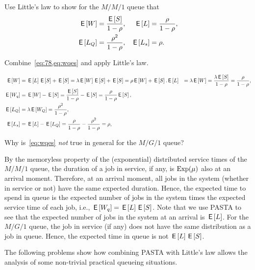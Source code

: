 \begin{exercise}
Use Little's law to show for the $M/M/1$ queue that 
  \begin{align*}
    \,\mathsf{E}\left[W\right] &= \frac{\,\mathsf{E}\left[S\right]}{1-\rho}, & \,\mathsf{E}\left[L\right] &= \frac\rho{1-\rho}, \\
    \,\mathsf{E}\left[L_Q\right] &= \frac{\rho^2}{1-\rho}, & \,\mathsf{E}\left[L_s\right] &= \rho.
  \end{align*}
\begin{hint}
  Combine~\cref{eq:78,eq:wqes} and apply Little's law. 
\end{hint}
\begin{solution}
\begin{align*}
  \,\mathsf{E}\left[W\right] &= \,\mathsf{E}\left[L\right] \,\mathsf{E}\left[S\right] + \,\mathsf{E}\left[S\right] = \lambda \,\mathsf{E}\left[W\right] \,\mathsf{E}\left[S\right] + \,\mathsf{E}\left[S\right]= \rho \,\mathsf{E}\left[W\right] + \,\mathsf{E}\left[S\right]. 
    \,\mathsf{E}\left[L\right] &= \lambda \,\mathsf{E}\left[W\right] = \frac{\lambda \,\mathsf{E}\left[S\right]}{1-\rho} = \frac\rho{1-\rho}, \\
    \,\mathsf{E}\left[W_q\right] &= \,\mathsf{E}\left[W\right] - \,\mathsf{E}\left[S\right] = \frac{\,\mathsf{E}\left[S\right]}{1-\rho} - \,\mathsf{E}\left[S\right] = \frac{\rho}{1-\rho} \,\mathsf{E}\left[S\right],\\
  \,\mathsf{E}\left[L_Q\right] &= \lambda \,\mathsf{E}\left[W_Q\right] = \frac{\rho^2}{1-\rho}, \\
  \,\mathsf{E}\left[L_s\right] &= \,\mathsf{E}\left[L\right] - \,\mathsf{E}\left[L_Q\right] = \frac{\rho}{1-\rho} - \frac{\rho^2}{1-\rho} = \rho, 
\end{align*}
\end{solution}
\end{exercise}

\begin{exercise}
Why is~\cref{eq:wqes} \emph{not} true in general for the $M/G/1$ queue? 
\begin{solution}
  By the memoryless property of the (exponential) distributed service times of the $M/M/1$ queue, the duration of a job in service, if any, is $\operatorname{Exp}(\mu)$ also at an arrival moment.
  Therefore, at an arrival moment, all jobs in the system (whether in service or not) have the same expected duration.
  Hence, the expected time to spend in queue is the expected number of jobs in the system times the expected service time of each job, i.e., $\,\mathsf{E}\left[W_q\right] = \,\mathsf{E}\left[L\right] \,\mathsf{E}\left[S\right]$.
  Note that we use PASTA to see that the expected number of jobs in the system at an arrival is $\,\mathsf{E}\left[L\right]$.
  For the $M/G/1$ queue, the job in service (if any) does not have the same distribution as a job in queue.
  Hence, the expected time in queue is not $\,\mathsf{E}\left[L\right] \,\mathsf{E}\left[S\right]$.
\end{solution}
\end{exercise}


The following problems show how combining PASTA with Little's law allows the analysis of some non-trivial practical queueing situations.

